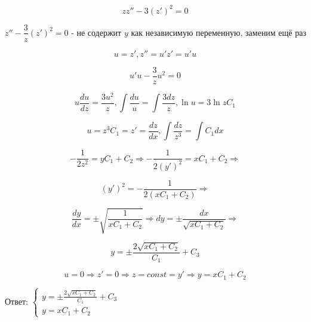 \documentclass{article}
\begin{document}
\begin{equation*}
    zz'' - 3(z')^2 = 0
\end{equation*}

\begin{equation*}
    z''  - \frac{3}{z}(z')^2 = 0 \text{ - не содержит $y$ как независимую переменную, заменим ещё раз}
\end{equation*}

\begin{equation*}
    u = z', z'' = u'z' = u'u
\end{equation*}

\begin{equation*}
    u'u - \frac{3}{z}u^2 = 0
\end{equation*}

\begin{equation*}
    u\frac{du}{dz} = \frac{3u^2}{z}, \int{\frac{du}{u}} = \int{\frac{3dz}{z}}, \ln{u} =3\ln{zC_1}
\end{equation*}

\begin{equation*}
    u = z^3C_1 = z' = \frac{dz}{dx}, \int{\frac{dz}{z^3}} = \int{C_1dx}
\end{equation*}

\begin{equation*}
    -\frac{1}{2z^2} = yC_1 + C_2 \Rightarrow -\frac{1}{2(y')^2} = xC_1 + C_2 \Rightarrow
\end{equation*}

\begin{equation*}
    (y')^2 = - \frac{1}{2(xC_1 + C_2)} \Rightarrow
\end{equation*}

\begin{equation*}
    \frac{dy}{dx} = \pm \sqrt{\frac{1}{xC_1 + C_2}} \Rightarrow dy = \pm \frac{dx}{\sqrt{xC_1 + C_2}} \Rightarrow
\end{equation*}

\begin{equation*}
    y = \pm \frac{2\sqrt{xC_1 + C_2}}{C_1} + C_3
\end{equation*}

\begin{equation*}
    u = 0 \Rightarrow z' = 0 \Rightarrow z = const = y' \Rightarrow y = xC_1 + C_2
\end{equation*}

Ответ: $
\begin{cases}
 y = \pm \frac{2\sqrt{xC_1 + C_2}}{C_1} + C_3 \\
 y = xC_1 + C_2
\end{cases}
$
\end{document}
